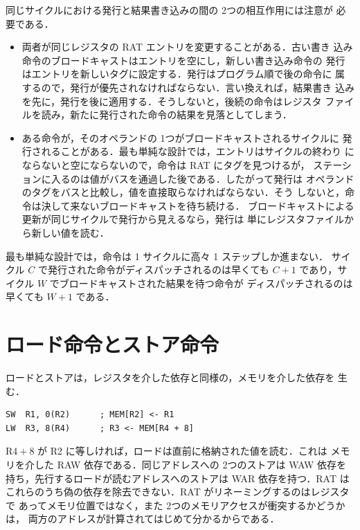 \documentclass[../main.tex]{subfiles}
\begin{document}
同じサイクルにおける発行と結果書き込みの間の 2つの相互作用には注意が
必要である．
\begin{itemize}
  \item 両者が同じレジスタの RAT エントリを変更することがある．古い書き
    込み命令のブロードキャストはエントリを空にし，新しい書き込み命令の
    発行はエントリを新しいタグに設定する．発行はプログラム順で後の命令に
    属するので，発行が優先されなければならない．言い換えれば，結果書き
    込みを先に，発行を後に適用する．そうしないと，後続の命令はレジスタ
    ファイルを読み，新たに発行された命令の結果を見落としてしまう．
  \item ある命令が，そのオペランドの 1つがブロードキャストされるサイクルに
    発行されることがある．最も単純な設計では，エントリはサイクルの終わり
    にならないと空にならないので，命令は RAT にタグを見つけるが，
    ステーションに入るのは値がバスを通過した後である．したがって発行は
    オペランドのタグをバスと比較し，値を直接取らなければならない．そう
    しないと，命令は決して来ないブロードキャストを待ち続ける．
    ブロードキャストによる更新が同じサイクルで発行から見えるなら，発行は
    単にレジスタファイルから新しい値を読む．
\end{itemize}

\begin{keypoint}
  最も単純な設計では，命令は 1 サイクルに高々 1 ステップしか進まない．
  サイクル $C$ で発行された命令がディスパッチされるのは早くても $C+1$
  であり，サイクル $W$ でブロードキャストされた結果を待つ命令が
  ディスパッチされるのは早くても $W+1$ である．
\end{keypoint}

\section{ロード命令とストア命令}
\label{sec:l07-load-store}

ロードとストアは，レジスタを介した依存と同様の，メモリを介した依存を
生む．
\begin{lstlisting}[language={[x86masm]Assembler}, numbers=none]
SW  R1, 0(R2)      ; MEM[R2] <- R1
LW  R3, 8(R4)      ; R3 <- MEM[R4 + 8]
\end{lstlisting}
R4${}+8$ が R2 に等しければ，ロードは直前に格納された値を読む．これは
メモリを介した RAW 依存である．同じアドレスへの 2つのストアは WAW 依存を
持ち，先行するロードが読むアドレスへのストアは WAR 依存を持つ．RAT は
これらのうち偽の依存を除去できない．RAT がリネーミングするのはレジスタで
あってメモリ位置ではなく，また 2つのメモリアクセスが衝突するかどうかは，
両方のアドレスが計算されてはじめて分かるからである．
\end{document}
